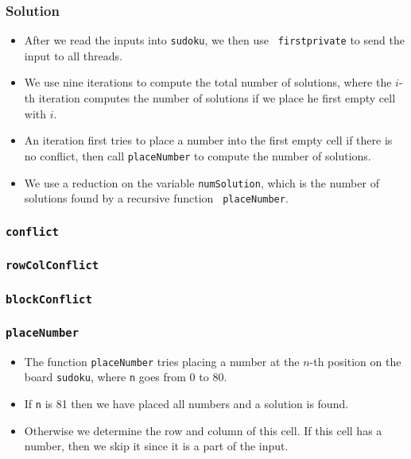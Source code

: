 \documentclass{beamer}
\begin{document}
\begin{frame}
\frametitle{Solution}
\begin{itemize}
\item After we read the inputs into {\tt sudoku}, we then use {\tt
  firstprivate} to send the input to all threads.
\item We use nine iterations to compute the total number of solutions,
  where the $i$-th iteration computes the number of solutions if we
  place he first empty cell with $i$.
\item An iteration first tries to place a number into the first empty
  cell if there is no conflict, then call {\tt placeNumber} to compute
  the number of solutions.
\item We use a reduction on the variable {\tt numSolution}, which is
  the number of solutions found by a recursive function {\tt
    placeNumber}.
\end{itemize}
\end{frame}

\begin{frame}
\frametitle{\tt conflict} 
\end{frame}

\begin{frame}
\frametitle{\tt rowColConflict} 
\end{frame}

\begin{frame}
\frametitle{\tt blockConflict} 
\end{frame}

\begin{frame}
\frametitle{\tt placeNumber}
\begin{itemize}
\item The function {\tt placeNumber} tries placing a number at the
  $n$-th position on the board {\tt sudoku}, where {\tt n} goes from 0
  to 80.
\item If {\tt n} is 81 then we have placed all numbers and a solution
  is found.
\item Otherwise we determine the row and column of this cell.  If this
  cell has a number, then we skip it since it is a part of the input.
\end{itemize}
\end{frame}
\end{document}
